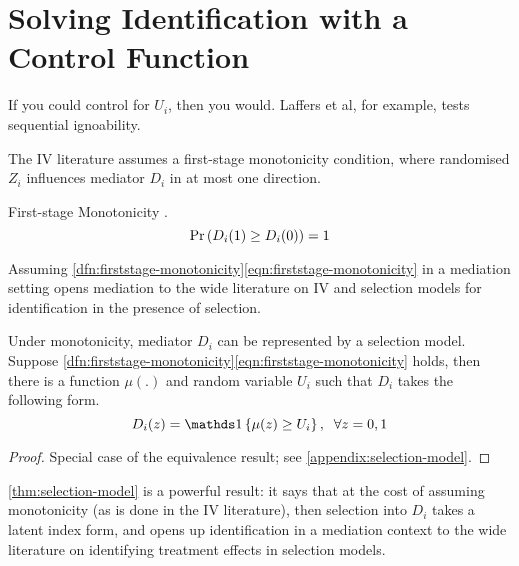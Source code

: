 \section{Solving Identification with a Control Function}
\label{sec:controlfun}

If you could control for $U_i$, then you would.
Laffers et al, for example, tests sequential ignoability.




The IV literature assumes a first-stage monotonicity condition, where randomised $Z_i$ influences mediator $D_i$ in at most one direction.
\begin{definition}
    \label{dfn:firststage-monotonicity}
    First-stage Monotonicity \citep{imbens1994identification}.
    \begin{equation}
        \label{eqn:firststage-monotonicity}
        \Pr\left(  D_i(1) \geq D_i(0) \right) = 1    
    \end{equation}
\end{definition}

Assuming \ref{dfn:firststage-monotonicity}\eqref{eqn:firststage-monotonicity}
in a mediation setting opens mediation to the wide literature on IV and selection models for identification in the presence of selection. 
\begin{theorem}
    \label{thm:selection-model}
    Under monotonicity, mediator $D_i$ can be represented by a selection model. \\
    Suppose \ref{dfn:firststage-monotonicity}\eqref{eqn:firststage-monotonicity} holds, then there is a function $\mu(.)$ and random variable $U_i$ such that $D_i$ takes the following form.
    \[ D_i(z) = \indicator{ \mu(z) \geq U_i}, \;\; \forall z = 0,1 \]
\end{theorem}
\begin{proof}
    Special case of the \cite{vytlacil2002independence} equivalence result; see \autoref{appendix:selection-model}.
\end{proof}

\autoref{thm:selection-model} is a powerful result: it says that at the cost of assuming monotonicity (as is done in the IV literature), then selection into $D_i$ takes a latent index form, and opens up identification in a mediation context to the wide literature on identifying treatment effects in selection models.
